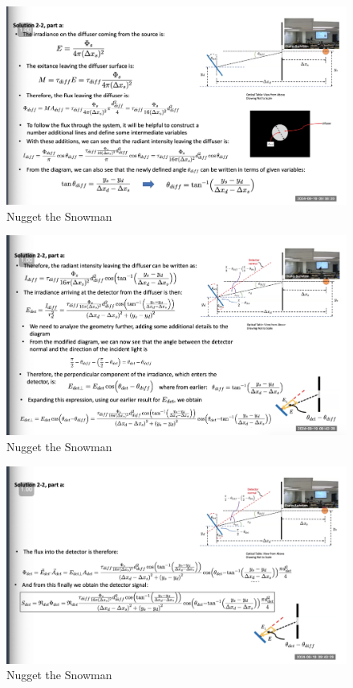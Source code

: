 \documentclass{article}
\begin{document}
\begin{figure}[h!]
\centering
\includegraphics[scale=.6]{Radiometry/Week4/Notes/PSET2/P2.png}
\caption{Nugget the Snowman}
\label{fig:P2}
\end{figure}


\begin{figure}[h!]
\centering
\includegraphics[scale=.6]{Radiometry/Week4/Notes/PSET2/P2a.png}
\caption{Nugget the Snowman}
\label{fig:P2a}
\end{figure}


\begin{figure}[h!]
\centering
\includegraphics[scale=.6]{Radiometry/Week4/Notes/PSET2/P2aa.png}
\caption{Nugget the Snowman}
\label{fig:P2aa}
\end{figure}
\end{document}
